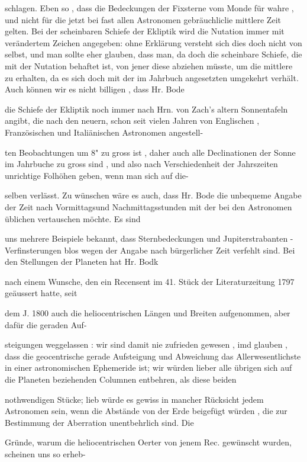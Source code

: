 \documentclass[10pt,a4paper]{article}
\begin{document}
schlagen. Eben so , dass die Bedeckungen der Fixsterne vom Monde für wahre , und nicht für die jetzt bei fast allen Astronomen gebräuchliclie mittlere Zeit gelten. Bei der scheinbaren Schiefe der Ekliptik wird die Nutation immer mit verändertem Zeichen angegeben: ohne Erklärung versteht sich dies doch nicht von selbst, und man sollte eher glauben, dass man, da doch die scheinbare Schiefe, die mit der Nutation behaftet ist, von jener diese abziehen müsste, um die mittlere zu erhalten, da es sich doch mit der im Jahrbuch angesetzten umgekehrt verhält. Auch können wir es nicht billigen , dass Hr. Bode

die Schiefe der Ekliptik noch immer nach Hrn. von Zach's altern Sonnentafeln angibt, die nach den neuern, schon seit vielen Jahren von Englischen , Französischen und Italiänischen Astronomen angestell-

ten Beobachtungen um 8" zu gross ist , daher auch alle Declinationen der Sonne im Jahrbuche zu gross sind , und also nach Verschiedenheit der Jahrszeiten unrichtige Folhöhen geben, wenn man sich auf die-

selben verlässt. Zu wünschen wäre es auch, dass Hr. Bode die unbequeme Angabe der Zeit nach Vormittagsund Nachmittagsstunden mit der bei den Astronomen üblichen vertauschen möchte. Es sind

uns mehrere Beispiele bekannt, dass Sternbedeckungen und Jupiterstrabanten - Verfinsterungen blos wegen der Angabe nach bürgerlicher Zeit verfehlt sind. Bei den Stellungen der Planeten hat Hr. Bodk

nach einem Wunsche, den ein Recensent im 41. Stück der Literaturzeitung 1797 geäussert hatte, seit

dem J. 1800 auch die heliocentrischen Längen und Breiten aufgenommen, aber dafür die geraden Auf-

steigungen weggelassen : wir sind damit nie zufrieden gewesen , imd glauben , dass die geocentrische gerade Aufsteigung und Abweichung das Allerwesentlichste in einer astronomischen Ephemeride ist; wir würden lieber alle übrigen sich auf die Planeten beziehenden Columnen entbehren, als diese beiden

nothwendigen Stücke; lieb würde es gewiss in mancher Rücksicht jedem Astronomen sein, wenn die Abstände von der Erde beigefügt würden , die zur Bestimmung der Aberration unentbehrlich sind. Die

Gründe, warum die heliocentrischen Oerter von jenem Rec. gewünscht wurden, scheinen uns so erheb-


\newpage
\end{document}
